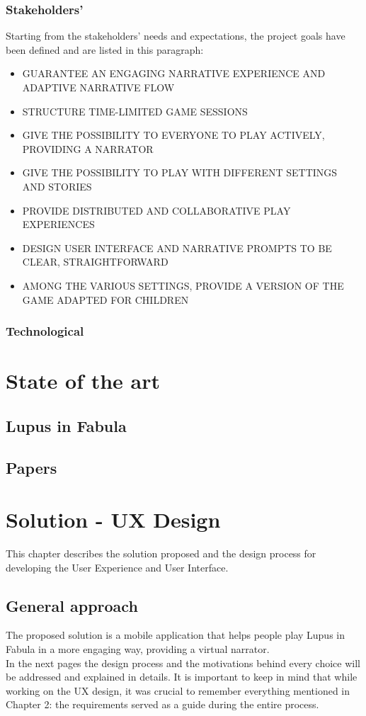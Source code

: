 \documentclass[12pt]{article}
\begin{document}
\subsubsection{Stakeholders'}
Starting from the stakeholders' needs and expectations, the project goals have been defined and are listed in this paragraph:
\begin{itemize}
    \item GUARANTEE AN ENGAGING NARRATIVE EXPERIENCE AND ADAPTIVE NARRATIVE FLOW
    \item STRUCTURE TIME-LIMITED GAME SESSIONS
    \item GIVE THE POSSIBILITY TO EVERYONE TO PLAY ACTIVELY, PROVIDING A NARRATOR
    \item GIVE THE POSSIBILITY TO PLAY WITH DIFFERENT SETTINGS AND STORIES
    \item PROVIDE DISTRIBUTED AND COLLABORATIVE PLAY EXPERIENCES 
    \item DESIGN USER INTERFACE AND NARRATIVE PROMPTS TO BE CLEAR, STRAIGHTFORWARD
    \item AMONG THE VARIOUS SETTINGS, PROVIDE A VERSION OF THE GAME ADAPTED FOR CHILDREN 
\end{itemize}
\subsubsection{Technological}

\newpage
\section{State of the art}
\subsection{Lupus in Fabula}
\subsection{Papers} %

\section{Solution - UX Design}
This chapter describes the solution proposed and the design process for developing the User Experience and User Interface. 
\subsection{General approach}
The proposed solution is a mobile application that helps people play Lupus in Fabula in a more engaging way, providing a virtual narrator. 
\\In the next pages the design process and the motivations behind every choice will be addressed and explained in details. It is important to keep in mind that while working on the UX design, it was crucial to remember everything mentioned in Chapter 2: the requirements served as a guide during the entire process. 
\end{document}
